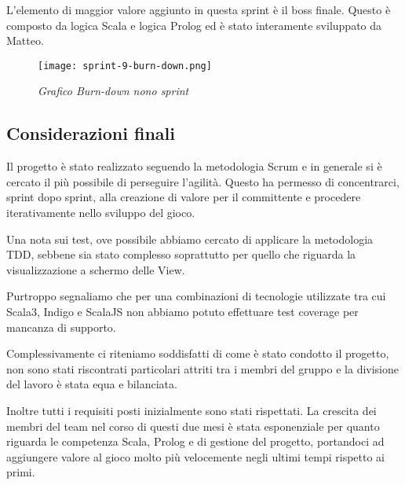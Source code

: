L'elemento di maggior valore aggiunto in questa sprint è il boss finale. Questo è composto da logica Scala e logica Prolog ed è stato interamente sviluppato da Matteo. 

\begin{figure}[H]
    \centering
    \texttt{[image: sprint-9-burn-down.png]}
    \caption{\textit{Grafico Burn-down nono sprint}} 
\end{figure}

\newpage
\subsection{Considerazioni finali}

Il progetto è stato realizzato seguendo la metodologia Scrum e in generale si è cercato il più possibile di perseguire l'agilità. 
Questo ha permesso di concentrarci, sprint dopo sprint, alla creazione di valore per il committente e procedere iterativamente nello sviluppo del gioco. 

Una nota sui test, ove possibile abbiamo cercato di applicare la metodologia TDD, sebbene sia stato complesso soprattutto per quello che riguarda la visualizzazione a schermo delle View. 

Purtroppo segnaliamo che per una combinazioni di tecnologie utilizzate tra cui Scala3, Indigo e ScalaJS non abbiamo potuto effettuare test coverage per mancanza di supporto. 

Complessivamente ci riteniamo soddisfatti di come è stato condotto il progetto, non sono stati riscontrati particolari attriti tra i membri del gruppo e la divisione del lavoro è stata equa e bilanciata.

Inoltre tutti i requisiti posti inizialmente sono stati rispettati.
La crescita dei membri del team nel corso di questi due mesi è stata esponenziale per quanto riguarda le competenza Scala, Prolog e di gestione del progetto, portandoci ad aggiungere valore al gioco molto più velocemente negli ultimi tempi rispetto ai primi. 

